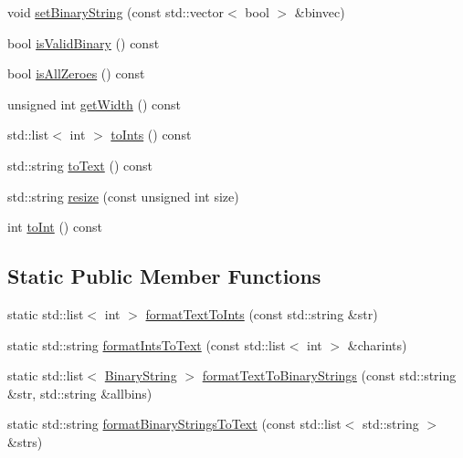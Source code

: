 \begin{DoxyCompactItemize}
\item 
void \hyperlink{classcryomesh_1_1state_1_1BinaryString_a70507e3fb33fbe4cfe158981ead72ed9}{set\-Binary\-String} (const std\-::vector$<$ bool $>$ \&binvec)
\item 
bool \hyperlink{classcryomesh_1_1state_1_1BinaryString_a80d5b4b762ec09b2a7e3a6945c2dc2d6}{is\-Valid\-Binary} () const 
\item 
bool \hyperlink{classcryomesh_1_1state_1_1BinaryString_a48ca7c2319260b3317561ea71f48efca}{is\-All\-Zeroes} () const 
\item 
unsigned int \hyperlink{classcryomesh_1_1state_1_1BinaryString_a09c187077c863fe9782334db0de63139}{get\-Width} () const 
\item 
std\-::list$<$ int $>$ \hyperlink{classcryomesh_1_1state_1_1BinaryString_a0c3ad2bc0926b0c1131e23e1fca1ce7a}{to\-Ints} () const 
\item 
std\-::string \hyperlink{classcryomesh_1_1state_1_1BinaryString_a6bd5aaed5f90ab29c8e057fc015f1092}{to\-Text} () const 
\item 
std\-::string \hyperlink{classcryomesh_1_1state_1_1BinaryString_ae65ca7d94f44208ba7aec54d1e691f6a}{resize} (const unsigned int size)
\item 
int \hyperlink{classcryomesh_1_1state_1_1BinaryString_add005a118d9b10305b8790397c9aae0e}{to\-Int} () const 
\end{DoxyCompactItemize}
\subsection*{\-Static \-Public \-Member \-Functions}
\begin{DoxyCompactItemize}
\item 
static std\-::list$<$ int $>$ \hyperlink{classcryomesh_1_1state_1_1BinaryString_a59b3856d1a5629a8c85734b5d226d102}{format\-Text\-To\-Ints} (const std\-::string \&str)
\item 
static std\-::string \hyperlink{classcryomesh_1_1state_1_1BinaryString_aa989d3c6ce4f5f155751628f091ee93a}{format\-Ints\-To\-Text} (const std\-::list$<$ int $>$ \&charints)
\item 
static std\-::list$<$ \hyperlink{classcryomesh_1_1state_1_1BinaryString}{\-Binary\-String} $>$ \hyperlink{classcryomesh_1_1state_1_1BinaryString_a78205804420ed2dc20fef3a81919bdff}{format\-Text\-To\-Binary\-Strings} (const std\-::string \&str, std\-::string \&allbins)
\item 
static std\-::string \hyperlink{classcryomesh_1_1state_1_1BinaryString_a3ce9e8a45b89bdf608249c5bfdeaea15}{format\-Binary\-Strings\-To\-Text} (const std\-::list$<$ std\-::string $>$ \&strs)
\end{DoxyCompactItemize}
